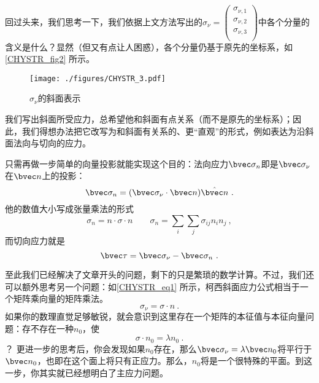 回过头来，我们思考一下，我们依据上文方法写出的$\sigma_\nu=
\begin{pmatrix}
\sigma_{\nu,1}\\
\sigma_{\nu,2}\\
\sigma_{\nu,3}\\
\end{pmatrix}$中各个分量的含义是什么？显然（但又有点让人困惑），各个分量仍基于原先的坐标系，如\autoref{CHYSTR_fig2} 所示。

\begin{figure}[ht]
\centering
\texttt{[image: ./figures/CHYSTR\_3.pdf]}
\caption{$\sigma_\nu$的斜面表示} \label{CHYSTR_fig3}
\end{figure}

我们写出斜面所受应力，总希望他和斜面有点关系（而不是原先的坐标系）；因此，我们得想办法把它改写为和斜面有关系的、更“直观”的形式，例如表达为沿斜面法向与切向的应力。

只需再做一步简单的向量投影就能实现这个目的：法向应力$\bvec \sigma_n$即是$\bvec \sigma_\nu$在$\bvec n$上的投影：
\begin{equation}
\bvec \sigma_n = (\bvec \sigma_\nu \cdot \bvec n)  \hat{\bvec n}~.
\end{equation}
他的数值大小写成张量乘法的形式
\begin{equation}
\sigma_n = n \cdot \sigma \cdot n 
\qquad \sigma_n =\sum_i \sum_j \sigma_{ij} n_i n_j~,
\end{equation}
而切向应力就是
\begin{equation}
\bvec \tau = \bvec \sigma_\nu - \bvec \sigma_n~.
\end{equation}

至此我们已经解决了文章开头的问题，剩下的只是繁琐的数学计算。不过，我们还可以额外思考另一个问题：如\autoref{CHYSTR_eq1} 所示，柯西斜面应力公式相当于一个矩阵乘向量的矩阵乘法。
$$\sigma_\nu = \sigma \cdot n~.$$
如果你的数理直觉足够敏锐，就会意识到这里存在一个矩阵的本征值与本征向量问题：存不存在一种$n_0$，使
$$
\sigma \cdot n_0 = \lambda n_0~.
$$？
更进一步的思考后，你会发现如果$n_0$存在，那么$\bvec \sigma_\nu = \lambda \bvec n_0$将平行于$\bvec n_0$，也即在这个面上将只有正应力。那么，$n_0$将是一个很特殊的平面。到这一步，你其实就已经想明白了主应力问题。

